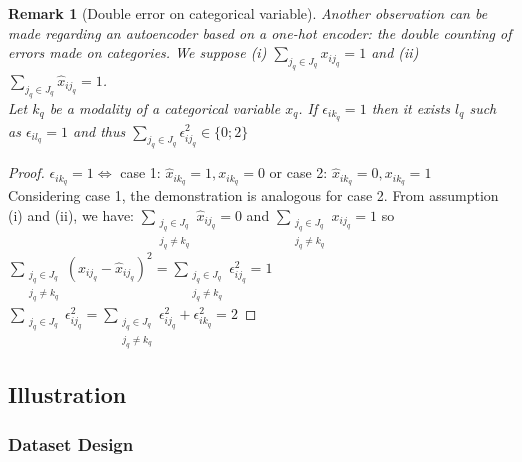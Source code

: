 \documentclass{article}
\def \w {\widehat}
\newtheorem{rem}{{\sc Remark}}
\theoremstyle{definition}
\begin{document}
\begin{rem}[Double error on categorical variable]
Another observation can be made regarding an autoencoder based on a one-hot encoder: the double counting of errors made on categories.
We suppose (i) $\sum_{j_q \in J_q} x_{ij_q}=1$ and (ii) $\sum_{j_q \in J_q} \w x_{ij_q}=1$.\\
Let $k_q$ be a modality of a categorical variable $x_q$. If $\epsilon_{ik_q}=1$ then it exists $l_q$ such as $\epsilon_{il_q}=1$ and thus $\sum_{j_q \in J_q}  \epsilon_{ij_q}^2 \in \{0;2\}$
\end{rem}
\begin{proof}
$\epsilon_{ik_q}=1 \Leftrightarrow $ case 1: $\w x_{ik_q}=1, x_{ik_q}=0$ or case 2: $\w x_{ik_q}=0, x_{ik_q}=1$\\
Considering case 1, the demonstration is analogous for case 2. From assumption (i) and (ii), we have:  
$\underset{\substack{j_q \in J_q \\ j_q \ne k_q}}{\sum}\w x_{ij_q} = 0$ and $\underset{\substack{j_q \in J_q \\ j_q \ne k_q}}{\sum} x_{ij_q} = 1$ so $\underset{\substack{j_q \in J_q \\ j_q \ne k_q}}{\sum} (x_{ij_q}-\w x_{ij_q})^2 = \underset{\substack{j_q \in J_q \\ j_q \ne k_q}}{\sum} \epsilon_{ij_q}^2  = 1$\\
$\underset{\substack{j_q \in J_q}}{\sum} \epsilon_{ij_q}^2 = \underset{\substack{j_q \in J_q \\ j_q \ne k_q}}{\sum} \epsilon_{ij_q}^2 + \epsilon_{ik_q}^2 = 2$
\end{proof}










\subsection{Illustration}

\subsubsection{Dataset Design} \label{datasetDesign}
\end{document}
